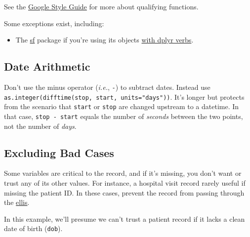 \documentclass[
]{book}
\providecommand{\tightlist}{%
  \setlength{\itemsep}{0pt}\setlength{\parskip}{0pt}}
\begin{document}
See the \href{https://google.github.io/styleguide/Rguide.html\#qualifying-namespaces}{Google Style Guide} for more about qualifying functions.

Some exceptions exist, including:

\begin{itemize}
\tightlist
\item
  The \href{https://r-spatial.github.io/sf/}{sf} package if you're using its objects \href{https://r-spatial.github.io/sf/articles/sf6.html\#why-do-dplyr-verbs-not-work-for-sf-objects}{with dplyr verbs}.
\end{itemize}

\hypertarget{coding-defensive-date-arithmetic}{%
\subsection{Date Arithmetic}\label{coding-defensive-date-arithmetic}}

Don't use the minus operator (\emph{i.e.}, \texttt{-}) to subtract dates. Instead use \texttt{as.integer(difftime(stop,\ start,\ units="days"))}. It's longer but protects from the scenario that \texttt{start} or \texttt{stop} are changed upstream to a datetime. In that case, \texttt{stop\ -\ start} equals the number of \emph{seconds} between the two points, not the number of \emph{days}.

\hypertarget{excluding-bad-cases}{%
\subsection{Excluding Bad Cases}\label{excluding-bad-cases}}

Some variables are critical to the record, and if it's missing, you don't want or trust any of its other values. For instance, a hospital visit record rarely useful if missing the patient ID. In these cases, prevent the record from passing through the \protect\hyperlink{pattern-ellis}{ellis}.

In this example, we'll presume we can't trust a patient record if it lacks a clean date of birth (\texttt{dob}).
\end{document}
